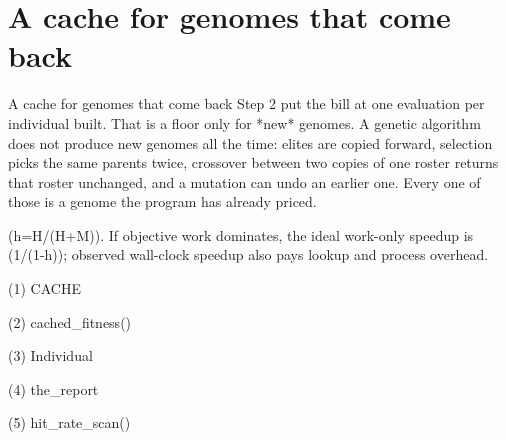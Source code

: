
\section{A cache for genomes that come back}

\begin{frame}{A cache for genomes that come back}
Step 2 put the bill at one evaluation per individual built. That is a floor
only for *new* genomes. A genetic algorithm does not produce new genomes all
the time: elites are copied forward, selection picks the same parents twice,
crossover between two copies of one roster returns that roster unchanged, and
a mutation can undo an earlier one. Every one of those is a genome the program
has already priced.

(h=H/(H+M)). If objective work dominates, the ideal work-only speedup is
(1/(1-h)); observed wall-clock speedup also pays lookup and process overhead.
\end{frame}

\begin{frame}[fragile]{(1) CACHE}

\end{frame}

\begin{frame}[fragile]{(2) cached\_fitness()}

\end{frame}

\begin{frame}[fragile]{(3) Individual}

\end{frame}

\begin{frame}[fragile]{(4) the\_report}

\end{frame}

\begin{frame}[fragile]{(5) hit\_rate\_scan()}

\end{frame}

